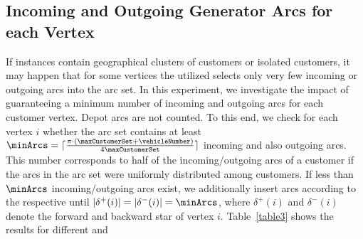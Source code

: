 \documentclass[11pt,a4paper,fleqn]{article}
\begin{document}
\subsection{Incoming and Outgoing Generator Arcs for each Vertex}
\label{sec:52}
If instances contain geographical clusters of customers or isolated customers, it may happen that for some vertices the utilized \sm selects only very few incoming or outgoing arcs into the \reduced arc set. In this experiment, we investigate the impact of guaranteeing a minimum number of incoming and outgoing arcs for each customer vertex. Depot arcs are not counted. To this end, we check for each vertex $i$ whether the \reduced arc set contains at least $\minArcs = \lceil \frac{\pi \cdot (\maxCustomerSet + \vehicleNumber)}{4 \maxCustomerSet} \rceil$ incoming and also outgoing arcs. This number corresponds to half of the incoming/outgoing arcs of a customer if the arcs in the \reduced arc set were uniformly distributed among customers. If less than $\minArcs$ incoming/outgoing arcs exist, we additionally insert arcs according to the respective \sm until $|\delta^+(i)| = |\delta^-(i)| = \minArcs$, where $\delta^+(i)$ and $\delta^-(i)$ denote the forward and backward star of vertex $i$.  Table~\ref{table3} shows the results for different \sms and \sfas {} 
\end{document}

